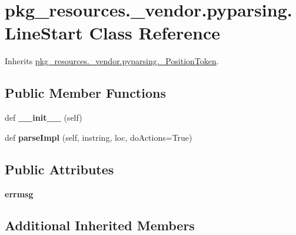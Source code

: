 \hypertarget{classpkg__resources_1_1__vendor_1_1pyparsing_1_1_line_start}{}\section{pkg\+\_\+resources.\+\_\+vendor.\+pyparsing.\+Line\+Start Class Reference}
\label{classpkg__resources_1_1__vendor_1_1pyparsing_1_1_line_start}


Inherits \hyperlink{classpkg__resources_1_1__vendor_1_1pyparsing_1_1___position_token}{pkg\+\_\+resources.\+\_\+vendor.\+pyparsing.\+\_\+\+Position\+Token}.

\subsection*{Public Member Functions}
\begin{DoxyCompactItemize}
\item 
\mbox{\label{classpkg__resources_1_1__vendor_1_1pyparsing_1_1_line_start_a0ccd31e14b4e89bc2d1ddb250c58b268}} 
def {\bfseries \+\_\+\+\_\+init\+\_\+\+\_\+} (self)
\item 
\mbox{\label{classpkg__resources_1_1__vendor_1_1pyparsing_1_1_line_start_a9b6bf2a434c9abe1522dd1c6884cfff4}} 
def {\bfseries parse\+Impl} (self, instring, loc, do\+Actions=True)
\end{DoxyCompactItemize}
\subsection*{Public Attributes}
\begin{DoxyCompactItemize}
\item 
\mbox{\label{classpkg__resources_1_1__vendor_1_1pyparsing_1_1_line_start_acffeb01aa42138e4ddf5d24102836be5}} 
{\bfseries errmsg}
\end{DoxyCompactItemize}
\subsection*{Additional Inherited Members}


